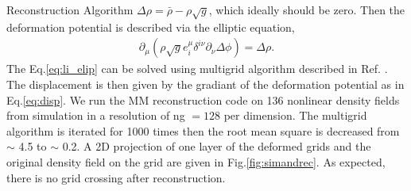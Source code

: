 \begin{section}{Reconstruction Algorithm}
$\Delta \rho = \bar{\rho}-\rho \sqrt{g}$, which ideally should be zero. 
Then the deformation potential is described via the elliptic equation,
\begin{align}
 \label{eq:li_elip}
    \partial _\mu (\rho \sqrt{g} e^\mu _i \delta^{i\nu}\partial_\nu \Delta \phi)=\Delta \rho.
\end{align}
The Eq.\ref{eq:li_elip} can be solved using multigrid algorithm described in Ref. 
\cite{bib:Pen1995,bib:Pen1998}. 
The displacement is then given by the gradiant of the deformation potential as in 
Eq.\ref{eq:disp}. We run the MM reconstruction code on 136 nonlinear density fields 
from simulation in a resolution of ng $=128$ per dimension. The multigrid algorithm 
is iterated for 1000 times then the root mean square is decreased from $\sim$ 4.5 
to $\sim$ 0.2. 
A 2D projection of one layer of the deformed grids and the 
original density field on the grid are given in Fig.\ref{fig:simandrec}. 
As expected, there is no grid crossing after reconstruction.
%
\end{section}

